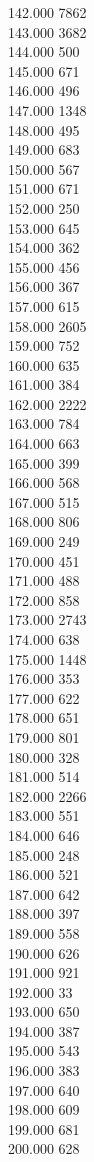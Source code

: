{ 142.000	7862 \\
 143.000	3682 \\
 144.000	500 \\
 145.000	671 \\
 146.000	496 \\
 147.000	1348 \\
 148.000	495 \\
 149.000	683 \\
 150.000	567 \\
 151.000	671 \\
 152.000	250 \\
 153.000	645 \\
 154.000	362 \\
 155.000	456 \\
 156.000	367 \\
 157.000	615 \\
 158.000	2605 \\
 159.000	752 \\
 160.000	635 \\
 161.000	384 \\
 162.000	2222 \\
 163.000	784 \\
 164.000	663 \\
 165.000	399 \\
 166.000	568 \\
 167.000	515 \\
 168.000	806 \\
 169.000	249 \\
 170.000	451 \\
 171.000	488 \\
 172.000	858 \\
 173.000	2743 \\
 174.000	638 \\
 175.000	1448 \\
 176.000	353 \\
 177.000	622 \\
 178.000	651 \\
 179.000	801 \\
 180.000	328 \\
 181.000	514 \\
 182.000	2266 \\
 183.000	551 \\
 184.000	646 \\
 185.000	248 \\
 186.000	521 \\
 187.000	642 \\
 188.000	397 \\
 189.000	558 \\
 190.000	626 \\
 191.000	921 \\
 192.000	33 \\
 193.000	650 \\
 194.000	387 \\
 195.000	543 \\
 196.000	383 \\
 197.000	640 \\
 198.000	609 \\
 199.000	681 \\
 200.000	628 \\
}
